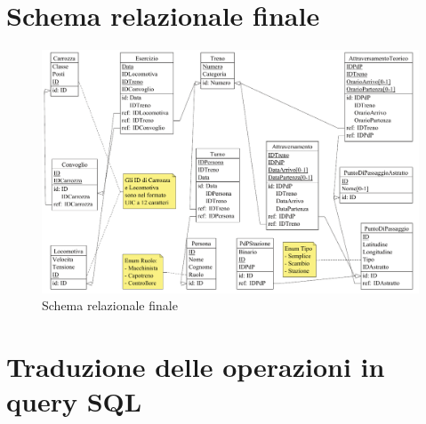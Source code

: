 \documentclass[a4paper,12pt]{report}
\begin{document}
	\section{Schema relazionale finale}
	\begin{figure}[h!]
		\begin{center}
			\includegraphics[width=\linewidth]{res/schema/logico}
		\end{center}
		\caption{Schema relazionale finale}
	\end{figure}
	\section{Traduzione delle operazioni in query SQL}
\end{document}
